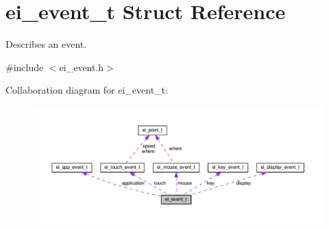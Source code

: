 \hypertarget{structei__event__t}{}\section{ei\+\_\+event\+\_\+t Struct Reference}
\label{structei__event__t}


Describes an event.  




{\ttfamily \#include $<$ei\+\_\+event.\+h$>$}



Collaboration diagram for ei\+\_\+event\+\_\+t\+:\nopagebreak
\begin{figure}[H]
\begin{center}
\leavevmode
\includegraphics[width=350pt]{structei__event__t__coll__graph}
\end{center}
\end{figure}
